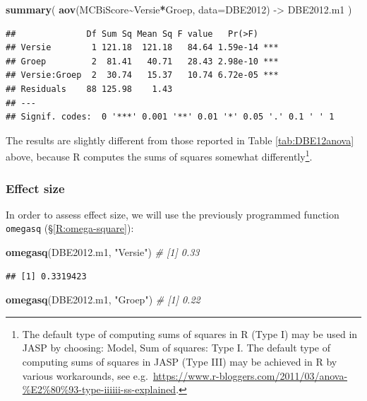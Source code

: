\documentclass[
]{book}
\newenvironment{Shaded}{\begin{snugshade}}{\end{snugshade}}
\newcommand{\AttributeTok}[1]{\textcolor[rgb]{0.13,0.29,0.53}{#1}}
\newcommand{\CommentTok}[1]{\textcolor[rgb]{0.56,0.35,0.01}{\textit{#1}}}
\newcommand{\FunctionTok}[1]{\textcolor[rgb]{0.13,0.29,0.53}{\textbf{#1}}}
\newcommand{\NormalTok}[1]{#1}
\newcommand{\OtherTok}[1]{\textcolor[rgb]{0.56,0.35,0.01}{#1}}
\newcommand{\SpecialCharTok}[1]{\textcolor[rgb]{0.81,0.36,0.00}{\textbf{#1}}}
\newcommand{\StringTok}[1]{\textcolor[rgb]{0.31,0.60,0.02}{#1}}
\begin{document}
\begin{Shaded}
\begin{Highlighting}[]
\FunctionTok{summary}\NormalTok{( }\FunctionTok{aov}\NormalTok{(MCBiScore}\SpecialCharTok{\textasciitilde{}}\NormalTok{Versie}\SpecialCharTok{*}\NormalTok{Groep, }\AttributeTok{data=}\NormalTok{DBE2012) }\OtherTok{{-}\textgreater{}}\NormalTok{ DBE2012.m1 )}
\end{Highlighting}
\end{Shaded}

\begin{verbatim}
##              Df Sum Sq Mean Sq F value   Pr(>F)    
## Versie        1 121.18  121.18   84.64 1.59e-14 ***
## Groep         2  81.41   40.71   28.43 2.98e-10 ***
## Versie:Groep  2  30.74   15.37   10.74 6.72e-05 ***
## Residuals    88 125.98    1.43                     
## ---
## Signif. codes:  0 '***' 0.001 '**' 0.01 '*' 0.05 '.' 0.1 ' ' 1
\end{verbatim}

The results are slightly different from those reported in Table \ref{tab:DBE12anova} above, because R computes the sums of squares somewhat differently\footnote{The default type of computing sums of squares in R (Type I) may be used in JASP by choosing: Model, Sum of squares: Type I. The default type of computing sums of squares in JASP (Type III) may be achieved in R by various workarounds, see e.g.~\url{https://www.r-bloggers.com/2011/03/anova-\%E2\%80\%93-type-iiiiii-ss-explained}.}.

\subsubsection{Effect size}\label{effectsize}

In order to assess effect size, we will use the previously programmed function \texttt{omegasq}
(§\ref{R:omega-square}):

\begin{Shaded}
\begin{Highlighting}[]
\FunctionTok{omegasq}\NormalTok{(DBE2012.m1, }\StringTok{"Versie"}\NormalTok{)        }\CommentTok{\# [1] 0.33}
\end{Highlighting}
\end{Shaded}

\begin{verbatim}
## [1] 0.3319423
\end{verbatim}

\begin{Shaded}
\begin{Highlighting}[]
\FunctionTok{omegasq}\NormalTok{(DBE2012.m1, }\StringTok{"Groep"}\NormalTok{)         }\CommentTok{\# [1] 0.22}
\end{Highlighting}
\end{Shaded}
\end{document}
